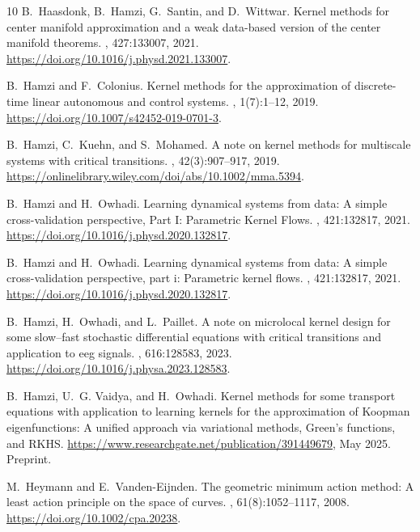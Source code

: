 \begin{thebibliography}{10}
B.~Haasdonk, B.~Hamzi, G.~Santin, and D.~Wittwar.
\newblock Kernel methods for center manifold approximation and a weak
  data-based version of the center manifold theorems.
, 427:133007, 2021.
\newblock \url{https://doi.org/10.1016/j.physd.2021.133007}.

B.~Hamzi and F.~Colonius.
\newblock Kernel methods for the approximation of discrete-time linear
  autonomous and control systems.
, 1(7):1--12, 2019.
\newblock \url{https://doi.org/10.1007/s42452-019-0701-3}.

B.~Hamzi, C.~Kuehn, and S.~Mohamed.
\newblock A note on kernel methods for multiscale systems with critical
  transitions.
, 42(3):907--917,
  2019.
\newblock \url{https://onlinelibrary.wiley.com/doi/abs/10.1002/mma.5394}.

B.~Hamzi and H.~Owhadi.
\newblock Learning dynamical systems from data: A simple cross-validation
  perspective, {P}art {I}: Parametric {K}ernel {F}lows.
, 421:132817, 2021.
\newblock \url{https://doi.org/10.1016/j.physd.2020.132817}.

B.~Hamzi and H.~Owhadi.
\newblock Learning dynamical systems from data: A simple cross-validation
  perspective, part i: Parametric kernel flows.
, 421:132817, 2021.
\newblock \url{https://doi.org/10.1016/j.physd.2020.132817}.

B.~Hamzi, H.~Owhadi, and L.~Paillet.
\newblock A note on microlocal kernel design for some slow–fast stochastic
  differential equations with critical transitions and application to eeg
  signals.
,
  616:128583, 2023.
\newblock \url{https://doi.org/10.1016/j.physa.2023.128583}.

B.~Hamzi, U.~G. Vaidya, and H.~Owhadi.
\newblock Kernel methods for some transport equations with application to
  learning kernels for the approximation of {K}oopman eigenfunctions: A unified
  approach via variational methods, {G}reen's functions, and {RKHS}.
\newblock \url{https://www.researchgate.net/publication/391449679}, May 2025.
\newblock Preprint.

M.~Heymann and E.~Vanden-Eijnden.
\newblock The geometric minimum action method: A least action principle on the
  space of curves.
,
  61(8):1052--1117, 2008.
\newblock \url{https://doi.org/10.1002/cpa.20238}.


\end{thebibliography}
